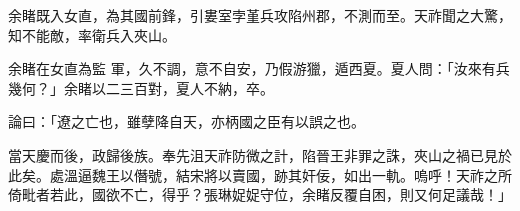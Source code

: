 \begin{pinyinscope}
 余睹既入女直，為其國前鋒，引婁室孛堇兵攻陷州郡，不測而至。天祚聞之大驚，知不能敵，率衛兵入夾山。



 余睹在女直為監
 軍，久不調，意不自安，乃假游獵，遁西夏。夏人問：「汝來有兵幾何？」余睹以二三百對，夏人不納，卒。



 論曰：「遼之亡也，雖孽降自天，亦柄國之臣有以誤之也。



 當天慶而後，政歸後族。奉先沮天祚防微之計，陷晉王非罪之誅，夾山之禍已見於此矣。處溫逼魏王以僭號，結宋將以賣國，跡其奸佞，如出一軌。嗚呼！天祚之所倚毗者若此，國欲不亡，得乎？張琳娖娖守位，余睹反覆自困，則又何足議哉！」



\end{pinyinscope}